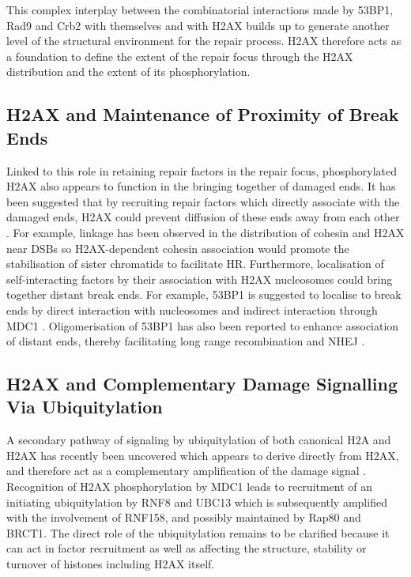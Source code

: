 This complex interplay between the combinatorial interactions made by
53BP1, Rad9 and Crb2 with themselves and with \textgamma H2AX builds
up to generate another level of the structural environment for the
repair process. \textgamma H2AX therefore acts as a foundation to
define the extent of the repair focus through the H2AX distribution
and the extent of its phosphorylation.

\subsection{\textgamma H2AX and Maintenance of Proximity of Break Ends}
Linked to this role in retaining repair factors in the repair focus,
phosphorylated H2AX also appears to function in the bringing together
of damaged ends. It has been suggested that by recruiting repair
factors which directly associate with the damaged ends, H2AX could
prevent diffusion of these ends away from each other \citep{BA04}. For
example, linkage has been observed in the distribution of cohesin and
\textgamma H2AX near DSBs \citep{UAS+04} so \textgamma H2AX-dependent
cohesin association would promote the stabilisation of sister
chromatids to facilitate HR\@. Furthermore, localisation of
self-interacting factors by their association with \textgamma H2AX
nucleosomes could bring together distant break ends. For example,
53BP1 is suggested to localise to break ends by direct interaction
with nucleosomes and indirect interaction through MDC1
\citep{HZDJ+04,BLW+06,EAR+09}. Oligomerisation of 53BP1 has also been
reported to enhance association of distant ends, thereby facilitating
long range recombination and NHEJ \citep{DGW+08,DCS+08}.

\subsection{\textgamma H2AX and Complementary Damage Signalling Via Ubiquitylation}
A secondary pathway of signaling by ubiquitylation of both canonical
H2A and H2AX has recently been uncovered which appears to derive
directly from \textgamma H2AX, and therefore act as a complementary
amplification of the damage signal \citep{PD09}. Recognition of H2AX
phosphorylation by MDC1 leads to recruitment of an initiating
ubiquitylation by RNF8 and UBC13 which is subsequently amplified with
the involvement of RNF158, and possibly maintained by Rap80 and
BRCT1\@. The direct role of the ubiquitylation remains to be clarified
because it can act in factor recruitment as well as affecting the
structure, stability or turnover of histones including H2AX itself.

